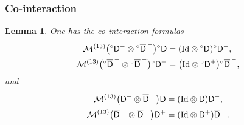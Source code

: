 \documentclass[10pt, reqno]{amsart}
\numberwithin{subsection}{section}
\numberwithin{subsubsection}{subsection}
\numberwithin{equation}{section} %
\theoremstyle{mystyle}
\newtheorem{lem}[thm]{\hspace{-0.14cm}  {Lemma} }%
\theoremstyle{mystyle2}
\theoremstyle{mystyle3}
\newcommand{\iden}{\text{\rm Id}}
\newcommand{\sfD}{\mathsf{D}}
\newcommand{\mcM}{\mathcal{M}}
\begin{document}

\subsubsection{Co-interaction}
\label{SubsectionAppendixCointeraction}

\begin{lem}
One has the co-interaction formulas
\begin{equation}\label{proof of cointercation} \begin{split}
\mcM^{(13)}\big({^{\circ}}\sfD^-\otimes{^{\circ}}\overline{\sf D}^{\,-}\big){^{\circ}}\sfD &= (\iden\otimes {^{\circ}}\sfD){^{\circ}}\sfD^-,   \\
\mcM^{(13)}\big({^{\circ}}\overline{\sf D}^{\,-}\otimes{^{\circ}}\overline{\sf D}^{\,-}\big){^{\circ}}\sfD^+ &= \big(\iden\otimes {^{\circ}}\sfD^+\big){^{\circ}}\overline{\sf D}^{\,-},
\end{split} \end{equation}
and
\begin{equation} \label{proof of cointercation bsD} \begin{split}
\mcM^{(13)}\big(\sfD^-\otimes\overline{\sfD}^{\,-}\big)\sfD &= (\iden\otimes \sfD)\sfD^-,   \\
\mcM^{(13)}\big(\overline{\sfD}^{\,-}\otimes\overline{\sfD}^{\,-}\big)\sfD^+ &= (\iden\otimes \sfD^+)\overline{\sfD}^{\,-}.
\end{split} \end{equation}
\end{lem}

\medskip
\end{document}
